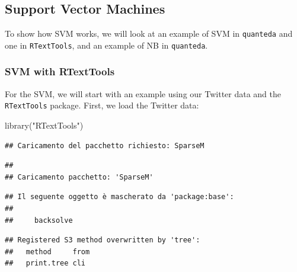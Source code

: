 \documentclass[
]{article}
\newenvironment{Shaded}{\begin{snugshade}}{\end{snugshade}}
\newcommand{\FunctionTok}[1]{\textcolor[rgb]{0.00,0.00,0.00}{#1}}
\newcommand{\NormalTok}[1]{#1}
\newcommand{\StringTok}[1]{\textcolor[rgb]{0.31,0.60,0.02}{#1}}
\begin{document}
\hypertarget{support-vector-machines}{%
\subsection{Support Vector Machines}\label{support-vector-machines}}

To show how SVM works, we will look at an example of SVM in \texttt{quanteda} and one in \texttt{RTextTools}, and an example of NB in \texttt{quanteda}.

\hypertarget{svm-with-rtexttools}{%
\subsubsection{SVM with RTextTools}\label{svm-with-rtexttools}}

For the SVM, we will start with an example using our Twitter data and the \texttt{RTextTools} package. First, we load the Twitter data:

\begin{Shaded}
\begin{Highlighting}[]
\FunctionTok{library}\NormalTok{(}\StringTok{"RTextTools"}\NormalTok{)}
\end{Highlighting}
\end{Shaded}

\begin{verbatim}
## Caricamento del pacchetto richiesto: SparseM
\end{verbatim}

\begin{verbatim}
## 
## Caricamento pacchetto: 'SparseM'
\end{verbatim}

\begin{verbatim}
## Il seguente oggetto è mascherato da 'package:base':
## 
##     backsolve
\end{verbatim}

\begin{verbatim}
## Registered S3 method overwritten by 'tree':
##   method     from
##   print.tree cli
\end{verbatim}
\end{document}
